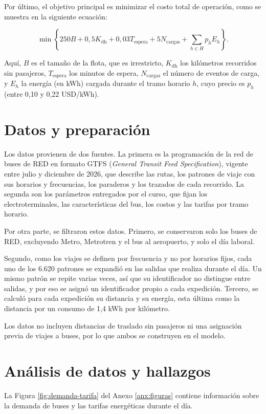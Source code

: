 Por último, el objetivo principal es minimizar el costo total de operación, como se muestra en la siguiente ecuación:

\begin{equation}
    \min
    \left\{
        250 B + 0{,}5 K_{\mathrm{dh}} + 0{,}03 T_{\mathrm{espera}}
        + 5 N_{\mathrm{cargas}}
        + \sum_{h \in H} p_h E_h
    \right\}.
    \label{eq:objetivo-global}
\end{equation}

Aquí, $B$ es el tamaño de la flota, que es irrestricto, $K_{\mathrm{dh}}$ los kilómetros recorridos sin pasajeros, $T_{\mathrm{espera}}$ los minutos de espera, $N_{\mathrm{cargas}}$ el número de eventos de carga, y $E_h$ la energía (en kWh) cargada durante el tramo horario $h$, cuyo precio es $p_h$ (entre 0,10 y 0,22 USD/kWh).



\section{Datos y preparación}
\label{sec:datos-informe2}

Los datos provienen de dos fuentes. La primera es la programación de la red de buses de RED en formato GTFS (\textit{General Transit Feed Specification}), vigente entre julio y diciembre de 2026, que describe las rutas, los patrones de viaje con sus horarios y frecuencias, los paraderos y los trazados de cada recorrido. La segunda son los parámetros entregados por el curso, que fijan los electroterminales, las características del bus, los costos y las tarifas por tramo horario.

Por otra parte, se filtraron estos datos. Primero, se conservaron solo los buses de RED, excluyendo Metro, Metrotren y el bus al aeropuerto, y solo el día laboral.

Segundo, como los viajes se definen por frecuencia y no por horarios fijos, cada uno de los 6.620 patrones se expandió en las salidas que realiza durante el día. Un mismo patrón se repite varias veces, así que su identificador no distingue entre salidas, y por eso se asignó un identificador propio a cada expedición. Tercero, se calculó para cada expedición su distancia y su energía, esta última como la distancia por un consumo de 1,4 kWh por kilómetro.

Los datos no incluyen distancias de traslado sin pasajeros ni una asignación previa de viajes a buses, por lo que ambos se construyen en el modelo.

\section{Análisis de datos y hallazgos}
\label{sec:modelo-informe2}
La Figura \ref{fig:demanda-tarifa} del Anexo \ref{anx:figuras} contiene información sobre la demanda de buses y las tarifas energéticas durante el día.

